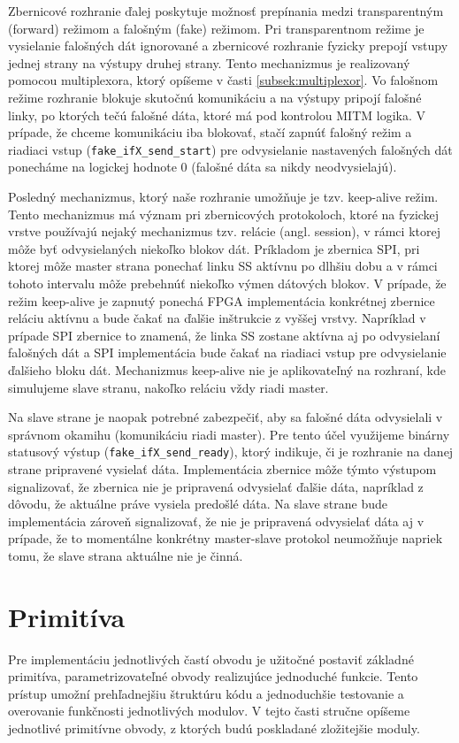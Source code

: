 Zbernicové rozhranie ďalej poskytuje možnosť prepínania medzi transparentným (forward) režimom a falošným (fake) režimom. Pri transparentnom režime je vysielanie falošných dát ignorované a zbernicové rozhranie fyzicky prepojí vstupy jednej strany na výstupy druhej strany. Tento mechanizmus je realizovaný pomocou multiplexora, ktorý opíšeme v časti \ref{subsek:multiplexor}. Vo falošnom režime rozhranie blokuje skutočnú komunikáciu a na výstupy pripojí falošné linky, po ktorých tečú falošné dáta, ktoré má pod kontrolou MITM logika. V prípade, že chceme komunikáciu iba blokovať, stačí zapnúť falošný režim a riadiaci vstup (\texttt{fake\_ifX\_send\_start}) pre odvysielanie nastavených falošných dát ponecháme na logickej hodnote 0 (falošné dáta sa nikdy neodvysielajú).

Posledný mechanizmus, ktorý naše rozhranie umožňuje je tzv. keep-alive režim. Tento mechanizmus má význam pri zbernicových protokoloch, ktoré na fyzickej vrstve používajú nejaký mechanizmus tzv. relácie (angl. session), v rámci ktorej môže byť odvysielaných niekoľko blokov dát. Príkladom je zbernica SPI, pri ktorej môže master strana ponechať linku SS aktívnu po dlhšiu dobu a v rámci tohoto intervalu môže prebehnúť niekoľko výmen dátových blokov. V prípade, že režim keep-alive je zapnutý ponechá FPGA implementácia konkrétnej zbernice reláciu aktívnu a bude čakať na ďalšie inštrukcie z vyššej vrstvy. Napríklad v prípade SPI zbernice to znamená, že linka SS zostane aktívna aj po odvysielaní falošných dát a SPI implementácia bude čakať na riadiaci vstup pre odvysielanie ďalšieho bloku dát. Mechanizmus keep-alive nie je aplikovateľný na rozhraní, kde simulujeme slave stranu, nakoľko reláciu vždy riadi master.

Na slave strane je naopak potrebné zabezpečiť, aby sa falošné dáta odvysielali v správnom okamihu (komunikáciu riadi master). Pre tento účel využijeme binárny statusový výstup (\texttt{fake\_ifX\_send\_ready}), ktorý indikuje, či je rozhranie na danej strane pripravené vysielať dáta. Implementácia zbernice môže týmto výstupom signalizovať, že zbernica nie je pripravená odvysielať ďalšie dáta, napríklad z dôvodu, že aktuálne práve vysiela predošlé dáta. Na slave strane bude implementácia zároveň signalizovať, že nie je pripravená odvysielať dáta aj v prípade, že to momentálne konkrétny master-slave protokol neumožňuje napriek tomu, že slave strana aktuálne nie je činná.

\section{Primitíva}
Pre implementáciu jednotlivých častí obvodu je užitočné postaviť základné primitíva, parametrizovateľné obvody realizujúce jednoduché funkcie. Tento prístup umožní prehľadnejšiu štruktúru kódu a jednoduchšie testovanie a overovanie funkčnosti jednotlivých modulov. V tejto časti stručne opíšeme jednotlivé primitívne obvody, z ktorých budú poskladané zložitejšie moduly.

